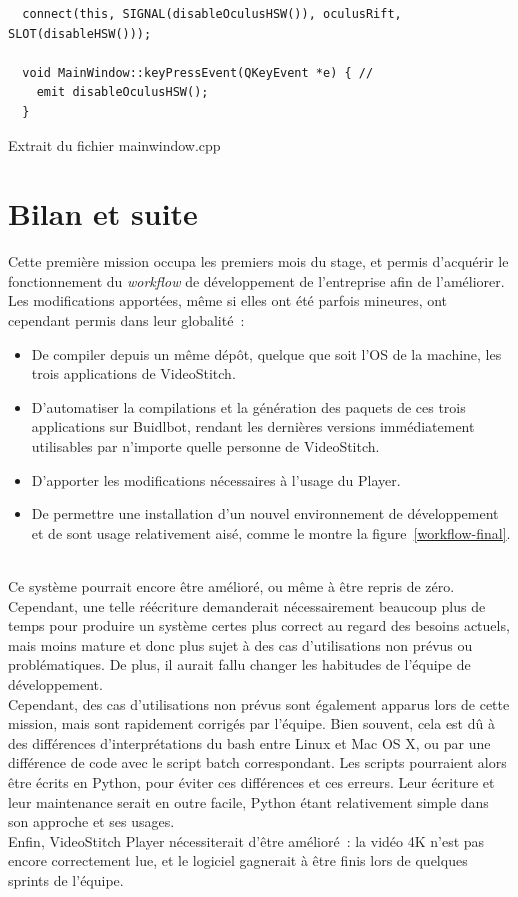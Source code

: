 \begin{listing}
  \begin{verbatim}
  connect(this, SIGNAL(disableOculusHSW()), oculusRift, SLOT(disableHSW()));
  
  void MainWindow::keyPressEvent(QKeyEvent *e) { // 
    emit disableOculusHSW();
  }
  \end{verbatim}
  \caption{Extrait du fichier mainwindow.cpp}
  \label{player-mainwindow}
\end{listing}


\section{Bilan et suite}
Cette première mission occupa les premiers mois du stage, et permis d'acquérir
le fonctionnement du \textit{workflow} de développement de l'entreprise afin de l'améliorer.
Les modifications apportées, même si elles ont été parfois mineures, ont cependant permis dans leur globalité~:
\begin{itemize}
 \item De compiler depuis un même dépôt, quelque que soit l'OS de la machine, les trois applications de VideoStitch.
 \item D'automatiser la compilations et la génération des paquets de ces trois applications 
 sur Buidlbot, rendant les dernières versions immédiatement utilisables par n'importe 
 quelle personne de VideoStitch.
 \item D'apporter les modifications nécessaires à l'usage du Player.
 \item De permettre une installation d'un nouvel environnement de développement et
 de sont usage relativement aisé, comme le montre la figure~\ref{workflow-final}.
\end{itemize}
\ \\
Ce système pourrait encore être amélioré, ou même à être repris de zéro. Cependant, 
une telle réécriture demanderait nécessairement beaucoup plus de temps pour
produire un système certes plus correct au regard des besoins actuels, mais moins mature
et donc plus sujet à des cas d'utilisations non prévus ou problématiques. De plus,
il aurait fallu changer les habitudes de l'équipe de développement.\\
Cependant, des cas d'utilisations non prévus sont également apparus lors de cette mission,
mais sont rapidement corrigés par l'équipe. Bien souvent, cela est dû à des différences
d'interprétations du bash entre Linux et Mac OS X, ou par une différence de code avec
le script batch correspondant. Les scripts pourraient alors être écrits en Python, pour
éviter ces différences et ces erreurs. Leur écriture et leur maintenance serait 
en outre facile, Python étant relativement simple dans son approche et ses usages.\\
Enfin, VideoStitch Player nécessiterait d'être amélioré~: la vidéo
4K n'est pas encore correctement lue, et le logiciel gagnerait à être finis lors
de quelques sprints de l'équipe.
